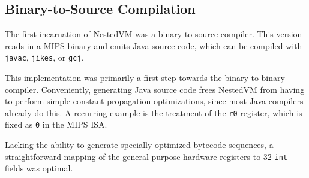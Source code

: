 \documentclass{acmconf}
\begin{document}
\subsection{Binary-to-Source Compilation}

The first incarnation of NestedVM was a binary-to-source compiler.
This version reads in a MIPS binary and emits Java source code, which
can be compiled with {\tt javac}, {\tt jikes}, or {\tt gcj}.

This implementation was primarily a first step towards the
binary-to-binary compiler.  Conveniently, generating Java source code
frees NestedVM from having to perform simple constant propagation
optimizations, since most Java compilers already do this.  A recurring
example is the treatment of the {\tt r0} register, which is fixed as
{\tt 0} in the MIPS ISA.

Lacking the ability to generate specially optimized bytecode
sequences, a straightforward mapping of the general purpose hardware
registers to 32 {\tt int} fields was optimal.
\end{document}
